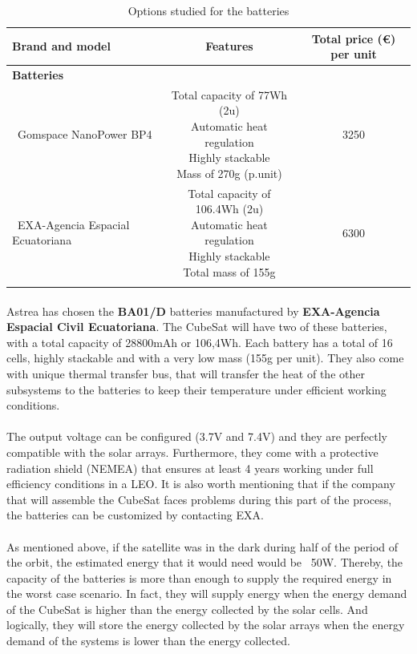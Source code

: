 \begin{longtable}{| l | c | c | }
\hline
\rowcolor[gray]{0.80}	\textbf{Brand and model} &  \textbf{Features}     & \textbf{Total price (\euro) per unit}   \\
\hline
\endfirsthead
\rowcolor[gray]{0.85} \textbf{Batteries} &  &  \\
	   ~Gomspace NanoPower BP4 & \makecell{Total capacity of 77Wh (2u) \\ Automatic heat regulation \\ Highly stackable \\ Mass of 270g (p.unit)} & 3250 \\
	\hline
	~EXA-Agencia Espacial Ecuatoriana & \makecell{Total capacity of 106.4Wh (2u)\\ Automatic heat regulation \\ Highly stackable \\ Total mass of 155g} & 6300 \\
	\hline
	
\caption{Options studied for the batteries}
\label{optionsbatteries}
\end{longtable}

\paragraph{}Astrea has chosen the \textbf{BA01/D} batteries manufactured by \textbf{EXA-Agencia Espacial Civil Ecuatoriana}. The CubeSat will have two of these batteries, with a total capacity of 28800mAh or 106,4Wh. Each battery has a total of 16 cells, highly stackable and with a very low mass (155g per unit). They also come with unique thermal transfer bus, that will transfer the heat of the other subsystems to the batteries to keep their temperature under efficient working conditions.

\paragraph{}The output voltage can be configured (3.7V and 7.4V) and they are perfectly compatible with the solar arrays. Furthermore, they come with a protective radiation shield (NEMEA) that ensures at least 4 years working under full efficiency conditions in a LEO. It is also worth mentioning that if the company that will assemble the CubeSat faces problems during this part of the process, the batteries can be customized by contacting EXA.

\paragraph{}As mentioned above, if the satellite was in the dark during half of the period of the orbit, the estimated energy that it would need would be ~50W. Thereby, the capacity of the batteries is more than enough to supply the required energy in the worst case scenario. In fact, they will supply energy when the energy demand of the CubeSat is higher than the energy collected by the solar cells. And logically, they will store the energy collected by the solar arrays when the energy demand of the systems is lower than the energy collected.